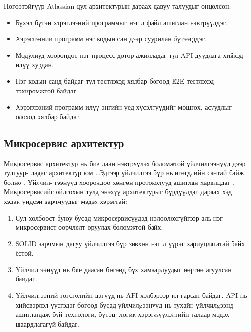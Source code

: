 Нөгөөтэйгүүр Atlassian \cite{atlassian_microservices} цул архитектурын дараах давуу талуудыг онцолсон:
\begin{itemize}
	\item Бүхэл бүтэн хэрэглээний программыг нэг л файл ашиглан нэвтрүүлдэг.
	\item Хэрэглээний программ нэг кодын сан дээр суурилан бүтээгддэг.
	\item Модулиуд хоорондоо нэг процесс дотор ажилладаг тул API дуудлага хийхэд илүү хурдан.
	\item Нэг кодын санд байдаг тул тестлэхэд хялбар бөгөөд E2E тестлэхэд тохиромжтой байдаг.
	\item Хэрэглээний программ илүү энгийн үед хүсэлтүүдийг мөшгөх, асуудлыг олоход хялбар байдаг.
\end{itemize}

\subsection{Микросервис архитектур}
\label{sec:microservices}
Микросервис архитектур нь бие даан нэвтрүүлэх боломжтой үйлчилгээнүүд дээр тулгуур- ладаг архитектур юм \cite{atlassian_microservices}. Эдгээр үйлчилгээ бүр нь өгөгдлийн сантай байж болно \cite{dragoni2017}. Үйлчил- гээнүүд хоорондоо хөнгөн протоколууд ашиглан харилцдаг \cite{blinowski2022}. Микросервисийг ойлгохын тулд энэхүү архитектурыг бүрдүүлдэг дараах хэд хэдэн үндсэн зарчмуудыг мэдэх хэрэгтэй:
\begin{enumerate}
	\item Сул холбоост буюу бусад микросервисүүдэд нөлөөлөхгүйгээр аль нэг микросервист өөрчлөлт оруулах боломжтой байх.
	\item SOLID\cite{blinowski2022} зарчмын дагуу үйлчилгээ бүр зөвхөн нэг л үүрэг хариуцлагатай байх ёстой.
	\item Үйлчилгээнүүд нь бие даасан бөгөөд бүх хамаарлуудыг өөртөө агуулсан байдаг.
	\item Үйлчилгээний төгсгөлийн цэгүүд нь API хэлбэрээр ил гарсан байдаг. API нь хийсвэрлэл үүсгэдэг бөгөөд бусад үйлчилgээнүүд нь тухайн үйлчилgээнд ашиглагдаж буй технологи, бүтэц, логик хэрэгжүүлэлтийн талаар мэдэх шаардлагагүй байдаг.
\end{enumerate}

